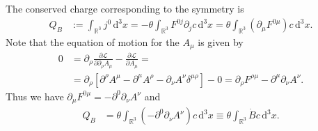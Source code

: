 \documentclass[english, parskip=full]{scrartcl}
\newcommand{\intr}{}
\newcommand{\kla}{}
\newcommand{\klam}{}
\begin{document}
The conserved charge corresponding to the symmetry is
\begin{align}
Q_B &:= \intr\int_{\mathbb{R}^{3}} j^0 \, \mathrm{d}^{3}x = -\theta \intr\int_{\mathbb{R}^{3}} F^{0j} \partial_j c \, \mathrm{d}^{3}x = \theta \intr\int_{\mathbb{R}^{3}} \kla\left( \partial_\mu F^{0\mu} \right) c \, \mathrm{d}^{3}x.
\end{align}
Note that the equation of motion for the $A_\mu$ is given by
\begin{align}
0 &= \partial_\rho \frac{\partial \mathcal{L}}{\partial \partial_\rho A_\mu} - \frac{\partial \mathcal{L}}{\partial A_\mu} = \\
&= \partial_\rho \klam\left[ \partial^\rho A^\mu - \partial^\mu A^\rho - \partial_\nu A^\nu \delta^{\mu\rho} \right] - 0 = \partial_\rho F^{\rho \mu} - \partial^\mu \partial_\nu A^\nu.
\end{align}
Thus we have $\partial_\mu F^{0\mu} = -\partial^0 \partial_\nu A^\nu$ and 
\begin{align}
Q_B &= \theta \intr\int_{\mathbb{R}^{3}} \kla\left( -\partial^0 \partial_\nu A^\nu \right) c \, \mathrm{d}^{3}x \equiv \theta \intr\int_{\mathbb{R}^{3}} \dot{B}c \, \mathrm{d}^{3}x.
\end{align}


\end{document}
